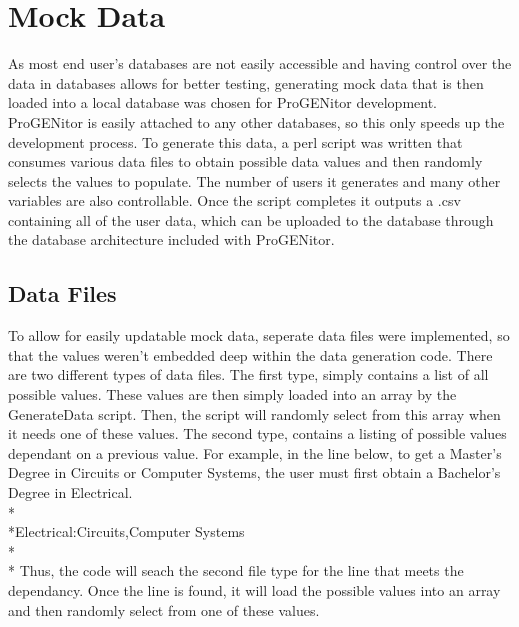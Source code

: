 \section{Mock Data}
\label{sect:mock-data}
As most end user's databases are not easily accessible and having control over
the data in databases allows for better testing, generating mock data that is
then loaded into a local database was chosen for ProGENitor development. 
ProGENitor is easily attached to any other databases, so this only speeds up the
development process.  To generate this data, a perl script was written that
consumes various data files to obtain possible data values and then randomly
selects the values to populate.  The number of users it generates and many other
variables are also controllable.  Once the script completes it outputs a .csv
containing all of the user data, which can be uploaded to the database through
the database architecture included with ProGENitor.

\subsection{Data Files}
To allow for easily updatable mock data, seperate data files were implemented,
so that the values weren't embedded deep within the data generation code.  There
are two different types of data files.  The first type, simply contains a list
of all possible values.  These values are then simply loaded into an array by
the GenerateData script.  Then, the script will randomly select from this
array when it needs one of these values.  The second type, contains a listing of
possible values dependant on a previous value.  For example, in the line below,
to get a Master's Degree in Circuits or Computer Systems, the user must first
obtain a Bachelor's Degree in Electrical.
\\*
\\*Electrical:Circuits,Computer Systems\\*
\\*
Thus, the code will seach the second file type for the line that meets the
dependancy.  Once the line is found, it will load the possible values into an
array and then randomly select from one of these values.

